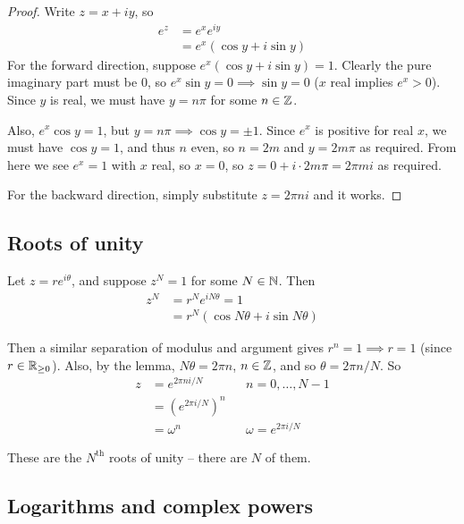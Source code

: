 \documentclass{../../template/note}
\begin{document}
    \begin{proof}
        Write \(z = x + iy\), so
        \begin{align*}
            e^z &= e^xe^{iy} \\
            &= e^x(\cos y + i \sin y)
        \end{align*}
        For the forward direction, suppose \(e^x(\cos y + i \sin y) = 1\). Clearly the pure imaginary part must be 0, so \(e^x \sin y = 0 \implies \sin y = 0\) (\(x\) real implies \(e^x > 0\)). Since \(y\) is real, we must have \(y = n\pi\) for some \(n \in \mathbb Z\).

        Also, \(e^x \cos y = 1\), but \(y = n \pi \implies \cos y = \pm 1\). Since \(e^x\) is positive for real \(x\), we must have \(\cos y = 1\), and thus \(n\) even, so \(n = 2m\) and \(y = 2m\pi\) as required. From here we see \(e^x = 1\) with \(x\) real, so \(x = 0\), so \(z = 0 + i \cdot 2 m \pi = 2 \pi m i\) as required.

        For the backward direction, simply substitute \(z = 2\pi n i\) and it works.
    \end{proof}
    
    \subsection{Roots of unity}

    Let \(z = re^{i \theta}\), and suppose \(z^N = 1\) for some \(N \in \mathbb N\). Then
    \begin{align*}
        z^N &= r^Ne^{iN\theta} = 1 \\
        &= r^N(\cos N\theta + i \sin N\theta)
    \end{align*}

    Then a similar separation of modulus and argument gives \(r^n = 1 \implies r = 1\) (since \(r \in \mathbb R_{\geq 0}\)). Also, by the lemma, \(N \theta = 2 \pi n\), \(n \in \mathbb Z\), and so \(\theta = 2\pi n / N\). So
    \begin{align*}
        z &= e^{2\pi n i / N} && n = 0, \dots, N-1 \\
        &= (e^{2\pi i / N})^n \\
        &= \omega^n && \omega = e^{2 \pi i / N}
    \end{align*}
    
    These are the \(N^\text{th}\) roots of unity -- there are \(N\) of them.

    \subsection{Logarithms and complex powers}
\end{document}
